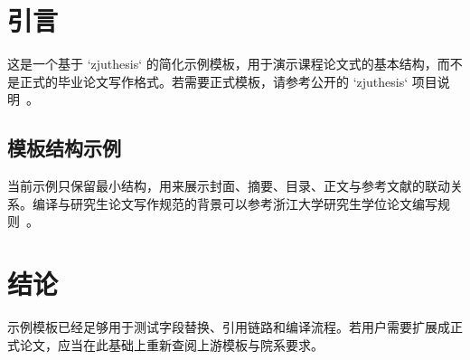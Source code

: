 ﻿\chapter{引言}

这是一个基于 `zjuthesis` 的简化示例模板，用于演示课程论文式的基本结构，而不是正式的毕业论文写作格式。若需要正式模板，请参考公开的 `zjuthesis` 项目说明~\cite{zjuthesis}。

\section{模板结构示例}

当前示例只保留最小结构，用来展示封面、摘要、目录、正文与参考文献的联动关系。编译与研究生论文写作规范的背景可以参考浙江大学研究生学位论文编写规则~\cite{zjugradthesisrules}。

\chapter{结论}

示例模板已经足够用于测试字段替换、引用链路和编译流程。若用户需要扩展成正式论文，应当在此基础上重新查阅上游模板与院系要求。
